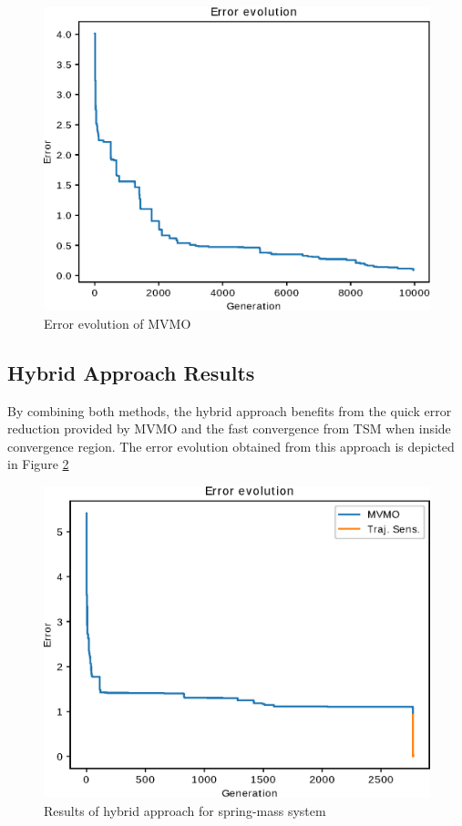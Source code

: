 \begin{figure}[h]
	\caption{Error evolution of MVMO}
	\begin{center}
		\includegraphics[scale=0.7]{Images/MVMO_conv.eps}
	\end{center}
	\label{fig: MVMO_conv}
\end{figure}

\subsection{Hybrid Approach Results}

By combining both methods, the hybrid approach benefits from the quick error reduction provided by MVMO and the fast convergence from TSM when inside convergence region. The error evolution obtained from this approach is depicted in Figure \ref{fig: Hybrid_conv}

\begin{figure}[h]
	\caption{Results of hybrid approach for spring-mass system}
	\begin{center}
		\includegraphics[scale=0.7]{Images/Hybrid_conv.eps}
	\end{center}
	\label{fig: Hybrid_conv}
\end{figure}

